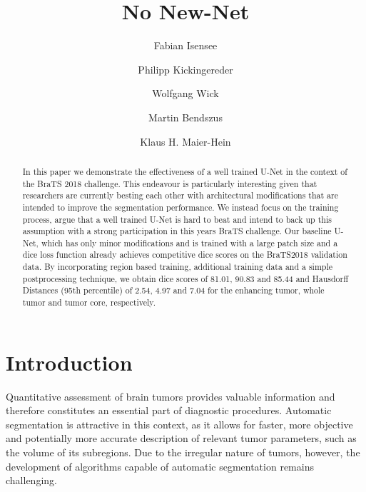 \documentclass{templates/llncs} %
\begin{document}


	\title{No New-Net}

	
	
  \author{Fabian Isensee  \and
    Philipp Kickingereder  \and
    Wolfgang Wick  \and
    Martin Bendszus  \and
    Klaus H. Maier-Hein }
  \tocauthor{**************, **************, **************}
	
	\maketitle   %
	
	
	\begin{abstract}
	    In this paper we demonstrate the effectiveness of a well trained U-Net in the context of the BraTS 2018 challenge. This endeavour is particularly interesting given that researchers are currently besting each other with architectural modifications that are intended to improve the segmentation performance. We instead focus on the training process, argue that a well trained U-Net is hard to beat and intend to back up this assumption with a strong participation in this years BraTS challenge. Our baseline U-Net, which has only minor modifications and is trained with a large patch size and a dice loss function already achieves competitive dice scores on the BraTS2018 validation data. By incorporating region based training, additional training data and a simple postprocessing technique, we obtain dice scores of 81.01, 90.83 and 85.44 and Hausdorff Distances (95th percentile) of 2.54, 4.97 and 7.04 for the enhancing tumor, whole tumor and tumor core, respectively.

%
\end{abstract}
	\section{Introduction}
	Quantitative assessment of brain tumors provides valuable information and therefore constitutes an essential part of diagnostic procedures. Automatic segmentation is attractive in this context, as it allows for faster, more objective and potentially more accurate description of relevant tumor parameters, such as the volume of its subregions. Due to the irregular nature of tumors, however, the development of algorithms capable of automatic segmentation remains challenging.
	
\end{document}
